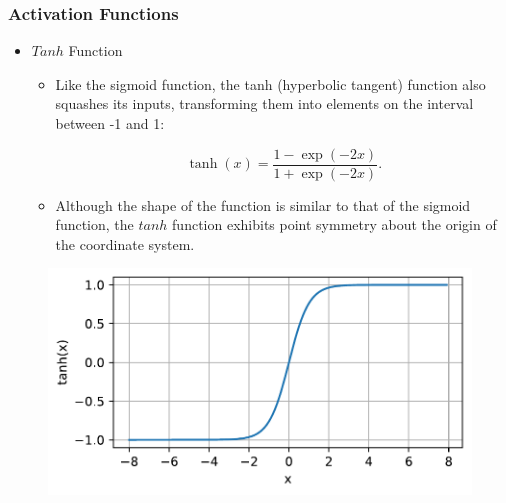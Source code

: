 \documentclass[
  shownotes,
  xcolor={svgnames},
  hyperref={colorlinks,citecolor=DarkBlue,linkcolor=DarkRed,urlcolor=DarkBlue}
  , aspectratio=169]{beamer}
\begin{document}
\begin{frame}
\frametitle{Activation Functions}




\begin{itemize}
    
\item $Tanh$ Function
  \begin{itemize}
        \item Like the sigmoid function, the tanh (hyperbolic tangent) function also squashes its inputs, transforming them into elements on the interval between -1 and 1:

        $$\operatorname{tanh}(x) = \frac{1 - \exp(-2x)}{1 + \exp(-2x)}.$$

        \item Although the shape of the function is similar to that of the sigmoid function, the $tanh$ function exhibits point symmetry about the origin of the coordinate system.
    \end{itemize}
\end{itemize}

  \begin{figure}[H] \centering
            \captionsetup{justification=centering}
              \includegraphics[scale=0.45]{figures/tanh}
              
 \end{figure}

\end{frame}
\end{document}
